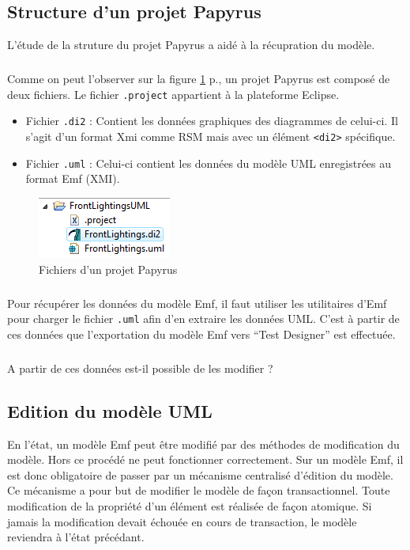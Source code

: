 \subsection{Structure d'un projet Papyrus}

L'étude de la struture du projet Papyrus a aidé à la récupration du modèle.

\subparagraph*{}
Comme on peut l'observer sur la figure \ref{PapyrusProject} p.\pageref{PapyrusProject}, un projet Papyrus est composé de deux fichiers. Le fichier \texttt{.project} appartient à la plateforme Eclipse.
\begin{itemize}
  \item Fichier \texttt{.di2} : Contient les données graphiques des diagrammes de celui-ci. Il s'agit d'un format Xmi comme RSM mais avec un élément \texttt{<di2>} spécifique.
  \item Fichier \texttt{.uml} : Celui-ci contient les données du modèle UML enregistrées au format Emf (XMI).
\end{itemize}

\begin{figure}[!h]
\begin{center}
  \includegraphics[scale=1]{images/PapyrusProject.png}
  \caption{Fichiers d'un projet Papyrus}
  \label{PapyrusProject}
\end{center}
\end{figure}

\subparagraph*{}
Pour récupérer les données du modèle Emf, il faut utiliser les utilitaires d'Emf pour charger le fichier \texttt{.uml} afin d'en extraire les données UML. C'est à partir de ces données que l'exportation du modèle Emf vers ``Test Designer'' est effectuée.

\subparagraph*{}
A partir de ces données est-il possible de les modifier ?

\subsection{Edition du modèle UML}\label{subsubsection:EditingDomaine}

En l'état, un modèle Emf peut être modifié par des méthodes de modification du modèle.
Hors ce procédé ne peut fonctionner correctement.
Sur un modèle Emf, il est donc obligatoire de passer par un mécanisme centralisé d'édition du modèle.
Ce mécanisme a pour but de modifier le modèle de façon transactionnel.
Toute modification de la propriété d'un élément est réalisée de façon atomique.
Si jamais la modification devait échouée en cours de transaction, le modèle reviendra à l'état précédant.

